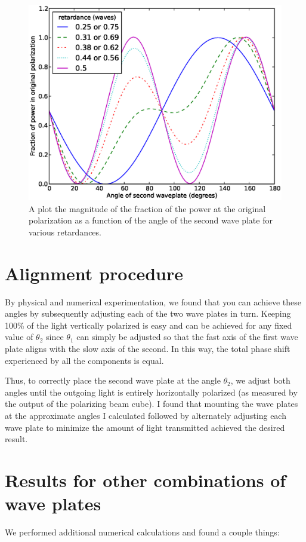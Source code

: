\begin{figure}
    \centerline{\includegraphics{NewNotesSymmetricFig}}
    \caption[Transmitted power vs angle]{\label{fig:numericalLightControlMethod}
    A plot the magnitude of the fraction of the power at the original polarization as a function of the angle of the second wave plate for various retardances.}
\end{figure}


\section{Alignment procedure}
By physical and numerical experimentation, we found that you can achieve these angles by subsequently adjusting each of the two wave plates in turn. Keeping 100\% of the light vertically polarized is easy and can be achieved for any fixed value of $\theta_2$ since $\theta_1$ can simply be adjusted so that the fast axis of the first wave plate aligns with the slow axis of the second. In this way, the total phase shift experienced by all the components is equal.

Thus, to correctly place the second wave plate at the angle  $\theta_2$, we adjust both angles until the outgoing light is entirely horizontally polarized (as measured by the output of the polarizing beam cube). I found that mounting the wave plates at the approximate angles I calculated followed by alternately adjusting each wave plate to minimize the amount of light transmitted achieved the desired result. 

\section{Results for other combinations of wave plates}
We performed additional numerical calculations and found a couple things:

